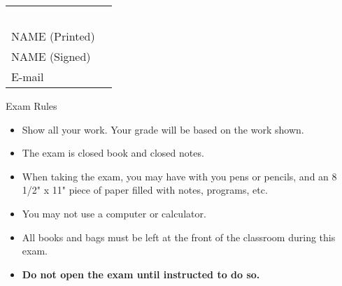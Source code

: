 {\large
\begin{center}
\begin{tabular}{ll}
\mbox{ }
\vspace{.1in} \\
NAME (Printed) & \ul{\hspace{3in}}\\ 
NAME (Signed) & \ul{\hspace{3in}} \\
E-mail & \ul{\hspace{3in}}\\
\end{tabular}
\end{center}


{\small
{\bf
\begin{center}
Exam Rules
\end{center}
\begin{itemize}
	\item Show all your work.  Your grade will be based on the work shown.          \item The exam is closed book and closed notes. 
        \item When taking the exam, you may have with you pens or pencils,
		and an 8 1/2" x 11" 
		piece of paper filled with notes, programs, etc. 
	\item You may not use a computer or calculator. 
	\item All books and bags must be left at the front of the classroom 
		during this exam. 
	\item {\bf Do not open the exam until instructed to do so. }
\end{itemize}
}

}}
